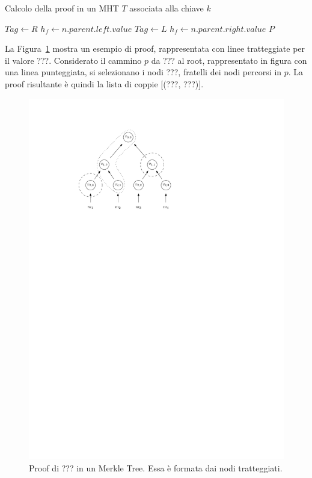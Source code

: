 \begin{algorithm}
	\caption{Calcolo della proof in un MHT $T$ associata alla chiave $k$}
	\begin{algorithmic}
					
					\State $Tag \leftarrow R$
					\State $h_f \leftarrow n.parent.left.value$
				\Else										{}
					\State $Tag \leftarrow L$
					\State $h_f \leftarrow n.parent.right.value$
				\EndIf
			\EndWhile
			\Return $P$
		\EndProcedure
	\end{algorithmic}
	\label{alg:proof}
\end{algorithm}

La Figura~\ref{fig:mht_proof} mostra un esempio di proof, rappresentata con linee tratteggiate per il valore ???. Considerato il cammino $p$ da ??? al root, rappresentato in figura con una linea punteggiata, si selezionano i nodi ???, fratelli dei nodi percorsi in $p$. La proof risultante è quindi la lista di coppie [(???, ???)].

\begin{figure}
	\centering
	\includegraphics{img/capuno/proof.pdf}
	\caption{Proof di ??? in un Merkle Tree. Essa è formata dai nodi tratteggiati.}
	\label{fig:mht_proof}
\end{figure}

